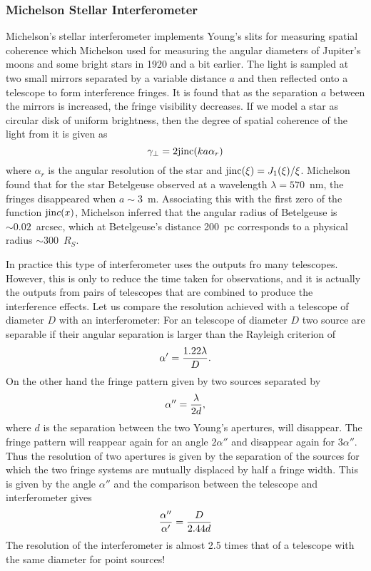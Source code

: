 \documentclass{article}
\begin{document}
\subsubsection{Michelson Stellar Interferometer}

Michelson's stellar interferometer implements Young's slits for measuring spatial coherence which Michelson used for measuring the angular diameters of Jupiter's 
moons and some bright stars in 1920 and a bit earlier. The light is sampled at two 
small mirrors separated by a variable distance $a$ and then reflected onto a telescope 
to form interference fringes. It is found that as the separation $a$ between the mirrors 
is increased, the fringe visibility decreases. If we model a star as circular disk of 
uniform brightness, then the degree of spatial coherence of the light from it is given
as 
\[
\gamma_\perp=2{\rm jinc}(ka\alpha_r)
\]
where $\alpha_r$ is the angular resolution of the star and 
${\rm jinc}(\xi)={J_1(\xi)/\xi}$. Michelson found that for the star Betelgeuse observed
at a wavelength $\lambda=570$~nm, the fringes disappeared when $a\sim 3$~m. 
Associating this with the first zero of the function ${\rm jin}c(x)$, Michelson inferred that
the angular radius of Betelgeuse is $\sim 0.02$~arcsec, which at Betelgeuse's distance
200~pc corresponds to a physical radius $\sim 300$~$R_S$.

In practice this type of interferometer uses the outputs fro many telescopes. However, this is only to reduce the time taken for observations, and it is actually the outputs from pairs of telescopes that are combined to produce the interference effects. Let us compare the resolution achieved with a telescope of diameter $D$ with an interferometer: For an telescope of diameter $D$ two source are separable if their angular separation is larger than the Rayleigh criterion of
\[ 
\alpha'={1.22\lambda\over D}.
\]
\noindent
On the other hand the fringe pattern given by two sources separated by 
\[
\alpha''={\lambda\over 2d},
\]
\noindent
where $d$ is the separation between the two Young's apertures, will disappear. The fringe pattern will reappear again for an angle $2\alpha''$ and disappear again for $3\alpha''$. Thus the resolution of two apertures is given by the separation of the sources for which the two fringe systems are mutually displaced by half a fringe width. This is given by the angle $\alpha''$ and the comparison between the telescope and interferometer gives
\[
{\alpha''\over\alpha'}={D\over 2.44d}
\]
\noindent
The resolution of the interferometer is almost 2.5 times that of a telescope with the same diameter for point sources! 
\end{document}
